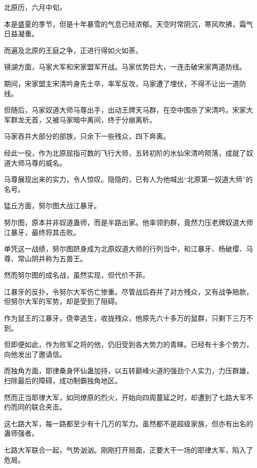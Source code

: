 
\begin{this_body}

北原历，六月中旬。

本是盛夏的季节，但是十年暴雪的气息已经浓郁。天空时常阴沉，寒风吹拂，霜气日益凝重。

而遍及北原的王庭之争，正进行得如火如荼。

镜湖方面，马家大军和宋家盟军开战。马家优势巨大，一连击破宋家两道防线。

期间，宋家盟主宋清吟身先士卒，率军反攻，马家遭了埋伏，不得不让出一道防线。

但随后，马家奴道大师马尊出手，出动王牌天马群，在空中围杀了宋清吟。宋家大军群龙无首，又被马家暗中离间，终于分崩离析。

马家吞并大部分的部族，只余下一些残众，四下奔离。

经此一役，作为北原屈指可数的飞行大师，五转初阶的水仙宋清吟陨落，成就了奴道大师马尊的威名。

马尊展现出来的实力，令人惊叹。隐隐的，已有人为他喊出“北原第一奴道大师”的名号。

猛丘方面，努尔图大战江暴牙。

努尔图，原本并非奴道蛊师，而是半路出家。他率领豹群，竟然力压老牌奴道大师江暴牙，最终将其击败。

单凭这一战绩，努尔图跻身成为北原奴道大师的行列当中，和江暴牙、杨破缨、马尊、常山阴并称为五兽王。

然而努尔图的成名战，虽然实现，但代价不菲。

江暴牙的反扑，令努尔大军伤亡惨重。尽管战后吞并了对方残众，又有战争赔款，但努尔大军的军势，却是受到了阻碍。

作为鼠王的江暴牙，侥幸逃生，收拢残众，他原先六十多万的鼠群，只剩下三万不到。

但即便如此，作为败军之将的他，仍旧受到各大势力的青睐。已经有十多个势力，向他发出了邀请信。

而独角方面，耶律桑身怀仙蛊加持，以五转巅峰火道的强劲个人实力，力压群雄，扫除最后的障碍，成功制霸独角地区。

然而正当耶律大军，如同燎原的烈火，开始向四周蔓延之时，却遭到了七路大军不约而同的联合夹击。

这七路大军，每一路都至少有十几万的军力。虽然都不是超级家族，但亦有出名的蛊师强者。

七路大军联合一起，气势汹汹。刚刚打开局面，正要大干一场的耶律大军，陷入了危局。


\end{this_body}
